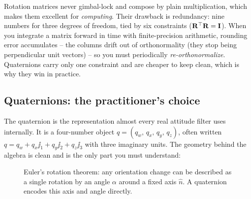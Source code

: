 \begin{whybox}
Rotation matrices never gimbal-lock and compose by plain multiplication, which makes
them excellent for \emph{computing}. Their drawback is redundancy: nine numbers for
three degrees of freedom, tied by six constraints ($\mathbf{R}^\top\mathbf{R}=\mathbf{I}$). When you
integrate a matrix forward in time with finite-precision arithmetic, rounding error
accumulates -- the columns drift out of orthonormality (they stop being perpendicular unit vectors) -- so you must periodically
\emph{re-orthonormalize}. Quaternions carry only one constraint and are cheaper to keep
clean, which is why they win in practice.
\end{whybox}

\subsection{Quaternions: the practitioner's choice}
\label{ch36:quat}

The quaternion is the representation almost every real attitude filter uses internally.
It is a four-number object $q = (q_w,\,q_x,\,q_y,\,q_z)$, often written
$q = q_w + q_x\jj_1 + q_y\jj_2 + q_z\jj_3$ with three imaginary units. The geometry
behind the algebra is clean and is the only part you must understand:

\begin{figure}[htbp]
\centering
{}
\caption{Euler's rotation theorem: any orientation change can be described as a single rotation by an angle $\alpha$ around a fixed axis $\hat{n}$. A quaternion encodes this axis and angle directly.}
\label{ch36:fig-axis-angle}
\end{figure}

